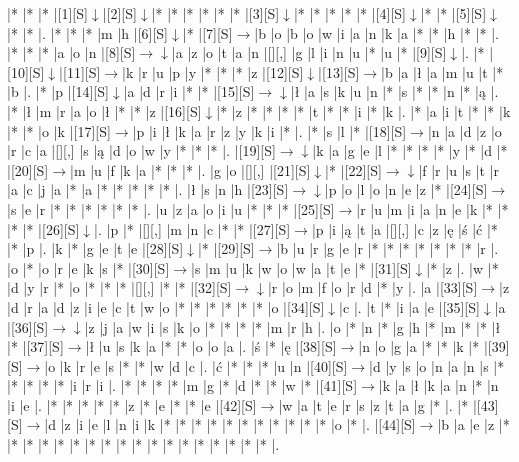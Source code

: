 \documentclass[11pt]{article}
\newcommand\drarr{$\rightarrow \!\!\!\!\! \downarrow$}
\newcommand\rarr{$\rightarrow$}
\newcommand\darr{$\downarrow$}
\begin{document}
\noindent\begin{Puzzle}{22}{24}|*	|*	|*	|[1][S]\darr	|[2][S]\darr	|*	|*	|*	|*	|*	|*	|[3][S]\darr	|*	|*	|*	|*	|*	|[4][S]\darr	|*	|*	|[5][S]\darr	|*	|*	|.
|*	|*	|*	|m	|h	|[6][S]\darr	|*	|[7][S]\rarr	|b	|o	|b	|o	|w	|i	|a	|n	|k	|a	|*	|*	|h	|*	|*	|.
|*	|*	|*	|a	|o	|n	|[8][S]\drarr	|a	|z	|o	|t	|a	|n	|[][,]{ }	|g	|l	|i	|n	|u	|*	|u	|*	|[9][S]\darr	|.
|*	|[10][S]\darr	|[11][S]\rarr	|k	|r	|u	|p	|y	|*	|*	|*	|z	|[12][S]\darr	|[13][S]\rarr	|b	|a	|ł	|a	|m	|u	|t	|*	|b	|.
|*	|p	|[14][S]\darr	|a	|d	|r	|i	|*	|*	|[15][S]\drarr	|ł	|a	|s	|k	|u	|n	|*	|s	|*	|*	|n	|*	|ą	|.
|*	|ł	|m	|r	|a	|o	|ł	|*	|*	|z	|[16][S]\darr	|*	|z	|*	|*	|*	|*	|t	|*	|*	|i	|*	|k	|.
|*	|a	|i	|t	|*	|*	|k	|*	|*	|o	|k	|[17][S]\rarr	|p	|i	|ł	|k	|a	|r	|z	|y	|k	|i	|*	|.
|*	|s	|l	|*	|[18][S]\rarr	|n	|a	|d	|z	|o	|r	|c	|a	|[][,]{ }	|s	|ą	|d	|o	|w	|y	|*	|*	|*	|.
|[19][S]\drarr	|k	|a	|g	|e	|l	|*	|*	|*	|*	|y	|*	|d	|*	|[20][S]\rarr	|m	|u	|f	|k	|a	|*	|*	|*	|.
|g	|o	|[][,]{ }	|[21][S]\darr	|*	|[22][S]\drarr	|f	|r	|u	|s	|t	|r	|a	|c	|j	|a	|*	|a	|*	|*	|*	|*	|*	|.
|ł	|s	|n	|h	|[23][S]\drarr	|p	|o	|l	|o	|n	|e	|z	|*	|[24][S]\rarr	|s	|e	|r	|*	|*	|*	|*	|*	|*	|.
|u	|z	|a	|o	|i	|u	|*	|*	|*	|[25][S]\rarr	|r	|u	|m	|i	|a	|n	|e	|k	|*	|*	|*	|*	|[26][S]\darr	|.
|p	|*	|[][,]{ }	|m	|n	|c	|*	|*	|[27][S]\rarr	|p	|i	|ą	|t	|a	|[][,]{ }	|c	|z	|ę	|ś	|ć	|*	|*	|p	|.
|k	|*	|g	|e	|t	|e	|[28][S]\darr	|*	|[29][S]\rarr	|b	|u	|r	|g	|e	|r	|*	|*	|*	|*	|*	|*	|*	|r	|.
|o	|*	|o	|r	|e	|k	|s	|*	|[30][S]\rarr	|s	|m	|u	|k	|w	|o	|w	|a	|t	|e	|*	|[31][S]\darr	|*	|z	|.
|w	|*	|d	|y	|r	|*	|o	|*	|*	|*	|[][,]{ }	|*	|*	|[32][S]\drarr	|r	|o	|m	|f	|o	|r	|d	|*	|y	|.
|a	|[33][S]\rarr	|z	|d	|r	|a	|d	|z	|i	|e	|c	|t	|w	|o	|*	|*	|*	|*	|*	|*	|o	|[34][S]\darr	|c	|.
|t	|*	|i	|a	|e	|[35][S]\darr	|a	|[36][S]\drarr	|z	|j	|a	|w	|i	|s	|k	|o	|*	|*	|*	|*	|m	|r	|h	|.
|o	|*	|n	|*	|g	|h	|*	|m	|*	|*	|ł	|*	|[37][S]\rarr	|ł	|u	|s	|k	|a	|*	|*	|o	|o	|a	|.
|ś	|*	|ę	|[38][S]\rarr	|n	|o	|g	|a	|*	|*	|k	|*	|[39][S]\rarr	|o	|k	|r	|e	|s	|*	|*	|w	|d	|c	|.
|ć	|*	|*	|*	|u	|n	|[40][S]\rarr	|d	|y	|s	|o	|n	|a	|n	|s	|*	|*	|*	|*	|*	|i	|r	|i	|.
|*	|*	|*	|*	|m	|g	|*	|d	|*	|*	|w	|*	|[41][S]\rarr	|k	|a	|ł	|k	|a	|n	|*	|n	|i	|e	|.
|*	|*	|*	|*	|*	|z	|*	|e	|*	|*	|e	|[42][S]\rarr	|w	|a	|t	|e	|r	|s	|z	|t	|a	|g	|*	|.
|*	|[43][S]\rarr	|d	|z	|i	|e	|l	|n	|i	|k	|*	|*	|*	|*	|*	|*	|*	|*	|*	|*	|*	|o	|*	|.
|[44][S]\rarr	|b	|a	|e	|z	|*	|*	|*	|*	|*	|*	|*	|*	|*	|*	|*	|*	|*	|*	|*	|*	|*	|*	|.\end{Puzzle}

\newpage
\end{document}
